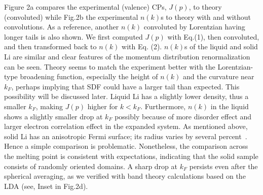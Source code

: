\documentclass[twocolumn,showpacs,showkeys,fleqn,prl,superscriptaddress]{revtex4}%
\newcommand{\nn}[1]{\textnormal{ #1}}
\begin{document}
Figure 2a compares the experimental (valence) CPs, $J(p)$, to theory (convoluted) while Fig.2b the experimental $n(k)$s to theory with and without convolutions.
As a reference, another $n(k)$ convoluted by Lorentzian having longer tails is also shown.
We first computed  $J(p)$ with Eq.(1), then convoluted, and then transformed back to $n(k)$ with Eq. (2).
$n(k)$s of the liquid and solid Li are similar and clear features of the momentum distribution renormalization can be seen.
Theory seems to match the experiment better with the Lorentzian-type broadening function, especially the height of $n(k)$ and the curvature near $k_F$, perhaps implying that SDF could have a larger tail than expected.
This possibility will be discussed later.
Liquid Li has a slightly lower density, thus a smaller $k_F$, making $J(p)$ higher for $k < k_F$.
Furthermore, $n(k)$ in the liquid shows a slightly smaller drop at $ k_F $  possibly because of more disorder effect and  larger electron correlation effect in the expanded system.
As mentioned above, solid Li has an anisotropic Fermi surface; its radius varies by several percent~\cite{saku95,schulke96}. Hence a simple comparison is problematic.
Nonetheless, the comparison across the melting point is consistent with expectations, indicating that the solid sample consists of randomly oriented domains.
A sharp drop at $k_F$ persists even after the spherical averaging, as we verified with band theory  calculations based on the LDA (see, Inset in Fig.2d).

\end{document}
